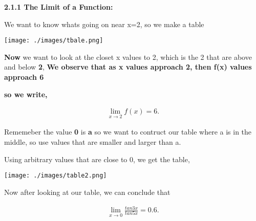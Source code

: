 \documentclass{report}
\begin{document}
    \pagebreak
    \begin{Large}
        \textbf{2.1.1 The Limit of a Function:}
    \end{Large}
    
   \bigbreak \noindent \bigbreak \noindent  

    \bigbreak \noindent 
    We want to know whats going on near x=2, so we make a table

    \bigbreak \noindent 
    \begin{center}
        \texttt{[image: ./images/tbale.png]}
    \end{center}

    \textbf{Now} we want to look at the closet x values to 2, 
    which is the 2 that are above and below \textbf{2}, \textbf{We observe that as x values approach
    2, then f(x) values approach 6}

    \bigbreak \noindent 
    \textbf{so we write,}    

    \begin{large}
        \begin{align*}
            \lim\limits_{x \to 2}{f \left(x\right) = 6}
        .\end{align*}
    \end{large}
    
    \bigbreak \noindent 
    
    \bigbreak \noindent 
    Rememeber the value \textbf{0} is \textbf{a} so we want to contruct our table where a 
    is in the middle, so use values that are smaller and larger than a.

    \bigbreak \noindent 
    Using arbitrary values that are close to 0, we get the table, 

    \bigbreak \noindent 
    \begin{center}
        \texttt{[image: ./images/table2.png]}
    \end{center}
    
    \bigbreak \noindent 
    Now after looking at our table, we can conclude that

    \bigbreak \noindent 

    \begin{large}
        \begin{align*}
            \lim\limits_{x \to0 }{ \frac{tan3x}{tan5x} = 0.6}
        .\end{align*}
    \end{large}
\end{document}
